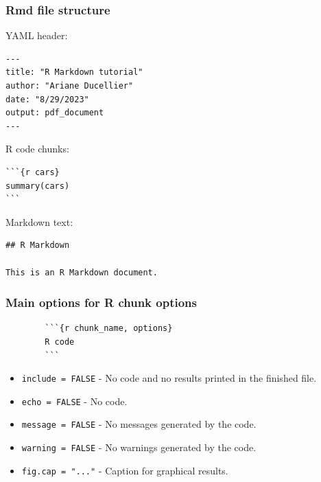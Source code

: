 \documentclass{beamer}
\begin{document}
	\begin{frame}[fragile]
		\frametitle{Rmd file structure}

		YAML header:

		\begin{exampleblock}{}
		\begin{BVerbatim}
---
title: "R Markdown tutorial"
author: "Ariane Ducellier"
date: "8/29/2023"
output: pdf_document
---
		\end{BVerbatim}
		\end{exampleblock}{}

		R code chunks:
		
		\begin{exampleblock}{}
		\begin{BVerbatim}
```{r cars}
summary(cars)
```
		\end{BVerbatim}
		\end{exampleblock}{}

		Markdown text:

		\begin{exampleblock}{}
		\begin{BVerbatim}
## R Markdown

This is an R Markdown document.
		\end{BVerbatim}
		\end{exampleblock}{}

	\end{frame}

	\begin{frame}[fragile]
		\frametitle{Main options for R chunk options}

		\begin{exampleblock}{}
		\begin{BVerbatim}
		```{r chunk_name, options}
		R code
		```
		\end{BVerbatim}
		\end{exampleblock}{}

		\vspace{1em}

		\begin{itemize}
			\item \verb|include = FALSE| - No code and no results printed in the finished file.
			\item \verb|echo = FALSE| - No code.
			\item \verb|message = FALSE| - No messages generated by the code.
			\item \verb|warning = FALSE| - No warnings generated by the code.
			\item \verb|fig.cap = "..."| - Caption for graphical results.
		\end{itemize}

	\end{frame}
\end{document}
